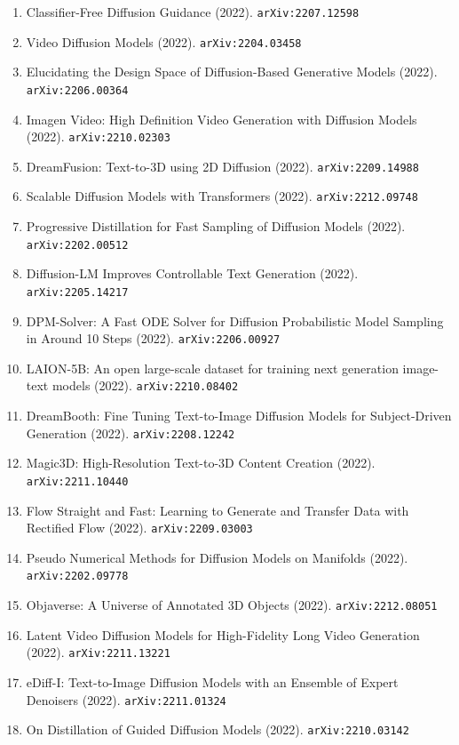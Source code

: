 \documentclass[11pt]{article}
\begin{document}
\begin{enumerate}
  Understanding (2022). \texttt{arXiv:2205.11487}
  \item Classifier-Free Diffusion Guidance (2022). \texttt{arXiv:2207.12598}
  \item Video Diffusion Models (2022). \texttt{arXiv:2204.03458}
  \item Elucidating the Design Space of Diffusion-Based Generative Models (2022). \texttt{arXiv:2206.00364}
  \item Imagen Video: High Definition Video Generation with Diffusion Models (2022). \texttt{arXiv:2210.02303}
  \item DreamFusion: Text-to-3D using 2D Diffusion (2022). \texttt{arXiv:2209.14988}
  \item Scalable Diffusion Models with Transformers (2022). \texttt{arXiv:2212.09748}
  \item Progressive Distillation for Fast Sampling of Diffusion Models (2022). \texttt{arXiv:2202.00512}
  \item Diffusion-LM Improves Controllable Text Generation (2022). \texttt{arXiv:2205.14217}
  \item DPM-Solver: A Fast ODE Solver for Diffusion Probabilistic Model Sampling
  in Around 10 Steps (2022). \texttt{arXiv:2206.00927}
  \item LAION-5B: An open large-scale dataset for training next generation
  image-text models (2022). \texttt{arXiv:2210.08402}
  \item DreamBooth: Fine Tuning Text-to-Image Diffusion Models for
  Subject-Driven Generation (2022). \texttt{arXiv:2208.12242}
  \item Magic3D: High-Resolution Text-to-3D Content Creation (2022). \texttt{arXiv:2211.10440}
  \item Flow Straight and Fast: Learning to Generate and Transfer Data with
  Rectified Flow (2022). \texttt{arXiv:2209.03003}
  \item Pseudo Numerical Methods for Diffusion Models on Manifolds (2022). \texttt{arXiv:2202.09778}
  \item Objaverse: A Universe of Annotated 3D Objects (2022). \texttt{arXiv:2212.08051}
  \item Latent Video Diffusion Models for High-Fidelity Long Video Generation (2022). \texttt{arXiv:2211.13221}
  \item eDiff-I: Text-to-Image Diffusion Models with an Ensemble of Expert
  Denoisers (2022). \texttt{arXiv:2211.01324}
  \item On Distillation of Guided Diffusion Models (2022). \texttt{arXiv:2210.03142}

\end{enumerate}
\end{document}
